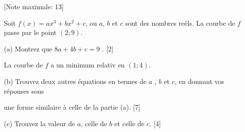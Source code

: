 \begin{question}
  \hspace*{\fill} [Note maximale: 13]\par
  \medskip
  \noindent Soit $f(x) = ax^3 + bx^2 + c$, ou $a$, $b$ et $c$ sont des nombres reéls. La courbe de $f$ passe par le point $(2;9)$.\par
  \medskip
  (a) Montrez que $8a + 4b +c = 9$ .\hspace*{\fill} [2]\par
  \medskip
  \noindent La courbe de $f$ a un minimum relativ en $(1; 4)$.\par
  \medskip
  (b) Trouvez deux autres équations en termes de $a$ , $b$ et $c$, en donnant vos réponses sous\par
  \hspace{1em} une forme similaire à celle de la partie (a).\hspace*{\fill} [7]\par
  (c) Trouvez la valeur de $a$, celle de $b$ et celle de $c$.\hspace*{\fill} [4]\par
\end{question}
